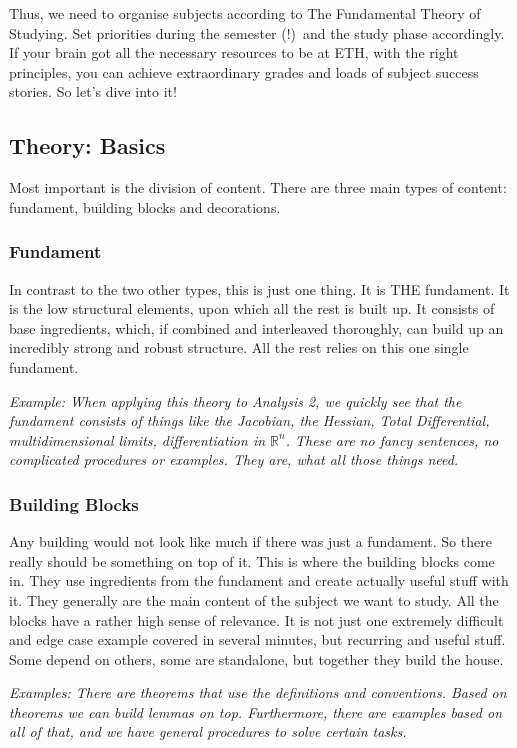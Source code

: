 Thus, we need to organise subjects according to The Fundamental Theory of Studying. Set priorities during the semester (!)\ and the study phase accordingly. If your brain got all the necessary resources to be at ETH, with the right principles, you can achieve extraordinary grades and loads of subject success stories. So let's dive into it!

\newpage

\subsection{Theory: Basics}
Most important is the division of content. There are three main types of content: fundament, building blocks and decorations.

\subsubsection{Fundament}
In contrast to the two other types, this is just one thing. It is THE fundament. It is the low structural elements, upon which all the rest is built up. It consists of base ingredients, which, if combined and interleaved thoroughly, can build up an incredibly strong and robust structure. All the rest relies on this one single fundament. 

\textit{Example: When applying this theory to Analysis 2, we quickly see that the fundament consists of things like the Jacobian, the Hessian, Total Differential, multidimensional limits, differentiation in $\mathbb{R}^n$. These are no fancy sentences, no complicated procedures or examples. They are, what all those things need.}

\subsubsection{Building Blocks}
Any building would not look like much if there was just a fundament. So there really should be something on top of it. 
This is where the building blocks come in. They use ingredients from the fundament and create actually useful stuff with it. They generally are the main content of the subject we want to study. All the blocks have a rather high sense of relevance. It is not just one extremely difficult and edge case example covered in several minutes, but recurring and useful stuff. 
Some depend on others, some are standalone, but together they build the house.

\textit{Examples: There are theorems that use the definitions and conventions. Based on theorems we can build lemmas on top. Furthermore, there are examples based on all of that, and we have general procedures to solve certain tasks.}

